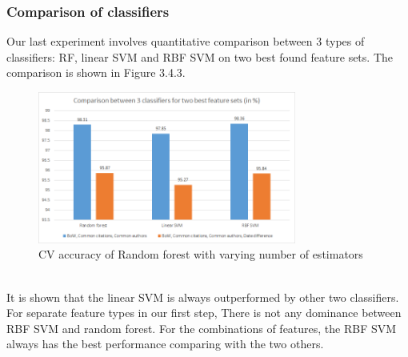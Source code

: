 \documentclass{article}
\begin{document}
\subsubsection{Comparison of classifiers}
Our last experiment involves quantitative comparison between 3 types of classifiers: RF, linear SVM and RBF SVM on two best found feature sets. The comparison is shown in Figure 3.4.3.
\begin{figure}[htb]
\begin{minipage}[b]{1.0\linewidth}
  \centering
  \centerline{\includegraphics[width=8.5cm]{classifier.png}}
\end{minipage}
\label{fig:classifier}
\caption{CV accuracy of Random forest with varying number of estimators}
\end{figure}\\
It is shown that the linear SVM is always outperformed by other two classifiers. For separate feature types in our first step, There is not any dominance between RBF SVM and random forest. For the combinations of features, the RBF SVM always has the best performance comparing with the two others.
\end{document}
